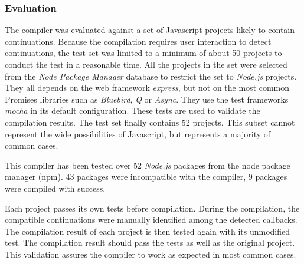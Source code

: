 \subsubsection{Evaluation} \label{chapter5:due:evaluation}




The compiler was evaluated against a set of Javascript projects likely to contain continuations.
Because the compilation requires user interaction to detect continuations, the test set was limited to a minimum of about \num{50} projects to conduct the test in a reasonable time.
All the projects in the set were selected from the \textit{Node Package Manager} database to restrict the set to \textit{Node.js} projects.
They all depends on the web framework \textit{express}, but not on the most common Promises libraries such as \textit{Bluebird}, \textit{Q} or \textit{Async}.
They use the test frameworks \textit{mocha} in its default configuration.
These tests are used to validate the compilation results.
The test set finally contains \num{52} projects.
This subset cannot represent the wide possibilities of Javascript, but represents a majority of common cases.



This compiler has been tested over \num{52} \textit{Node.js} packages from the node package manager (npm).
43 packages were incompatible with the compiler, 9 packages were compiled with success.



Each project passes its own tests before compilation.
During the compilation, the compatible continuations were manually identified among the detected callbacks.
The compilation result of each project is then tested again with its unmodified test.
The compilation result should pass the tests as well as the original project.
This validation assures the compiler to work as expected in most common cases.


